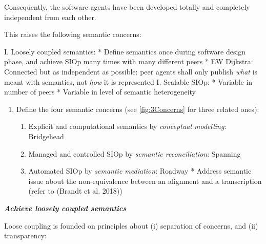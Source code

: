 \documentclass[a4paper,11pt,oneside,oldfontcommands]{memoir}
\newcounter{para}
\theoremstyle{definition}
\theoremstyle{break}		%
\numberwithin{equation}{chapter}
\numberwithin{figure}{chapter}
\begin{document}
Consequently, the software agents have been developed totally and
completely independent from each other.

This raises the following semantic concerns:

I. Loosely coupled semantics: * Define semantics once during software
design phase, and achieve SIOp many times with many different peers * EW
Dijkstra: Connected but as independent as possible: peer agents shall
only publish \emph{what} is meant with semantics, not \emph{how} it is
represented I. Scalable SIOp: * Variable in number of peers * Variable
in level of semantic heterogeneity

\begin{enumerate}
\def\labelenumi{\arabic{enumi}.}
\tightlist
\item
  Define the four semantic concerns (see \cref{fig:3Concerns} for three
  related ones):

  \begin{enumerate}
  \def\labelenumii{\roman{enumii}.}
  \tightlist
  \item
    Explicit and computational semantics by \emph{conceptual modelling}:
    Bridgehead
  \item
    Managed and controlled SIOp by \emph{semantic reconciliation}:
    Spanning
  \item
    Automated SIOp by \emph{semantic mediation}: Roadway * Address
    semantic issue about the non-equivalence between an alignment and a
    transcription (refer to (Brandt et al. 2018))
  \end{enumerate}
\end{enumerate}

\textbf{\emph{Achieve loosely coupled semantics}}

Loose coupling is founded on principles about (i) separation of
concerns, and (ii) transparency:
\end{document}
